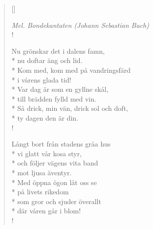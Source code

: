 
\settowidth{\versewidth}{Kom med, kom med på vandringsfärd}



\begin{verse}[\versewidth]

\flagverse{}
\emph{Mel. Bondekantaten (Johann Sebastian Bach)}\\!

Nu grönskar det i dalens famn,\\*
nu doftar äng och lid.\\*
Kom med, kom med på vandringsfärd\\*
i vårens glada tid!\\*
Var dag är som en gyllne skål,\\*
till brädden fylld med vin.\\*
Så drick, min vän, drick sol och doft,\\*
ty dagen den är din.\\!


Långt bort från stadens gråa hus\\*
vi glatt vår kosa styr,\\*
och följer vägens vita band\\*
mot ljusa äventyr.\\*
Med öppna ögon låt oss se\\*
på livets rikedom\\*
som gror och sjuder överallt\\*
där våren går i blom!\\!




\end{verse}

